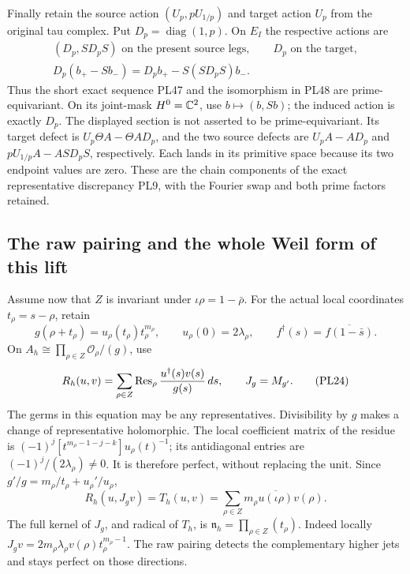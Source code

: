Finally retain the source action
\((U_p,pU_{1/p})\) and target action \(U_p\) from the original
tau complex. Put \(D_p=\operatorname{diag}(1,p)\).
On \(E_I\) the respective actions are
\[
 \begin{gathered}
 (D_p,SD_pS)\text{ on the present source legs},\qquad
 D_p\text{ on the target},\\
 D_p(b_+-Sb_-)=D_pb_+-S(SD_pS)b_-.
 \end{gathered}
 \tag{PL49}
\]
Thus the short exact sequence PL47 and the isomorphism in PL48
are prime-equivariant. On its joint-mask \(H^0=\mathbb C^2\), use
\(b\mapsto(b,Sb)\); the induced action is exactly \(D_p\).
The displayed section is not asserted to be prime-equivariant.
Its target defect is \(U_p\Theta A-\Theta A D_p\), and the two
source defects are \(U_pA-AD_p\) and
\(pU_{1/p}A-ASD_pS\), respectively. Each lands in its primitive
space because its two endpoint values are zero. These are the
chain components of the exact representative discrepancy PL9,
with the Fourier swap and both prime factors retained.

\subsection{The raw pairing and the whole Weil form of this lift}
Assume now that \(Z\) is invariant under
\(\iota\rho=1-\bar\rho\). For the actual local coordinates
\(t_\rho=s-\rho\), retain
\[
 g(\rho+t_\rho)=u_\rho(t_\rho)t_\rho^{m_\rho},
 \qquad u_\rho(0)=2\lambda_\rho,\qquad
 f^\dagger(s)=\overline{f(1-\bar s)}.
 \tag{PL23}
\]
On \(A_h\cong\prod_{\rho\in Z}\mathcal O_\rho/(g)\), use
\[
 R_h(u,v)=\sum_{\rho\in Z}\operatorname{Res}_\rho
       \frac{u^\dagger(s)v(s)}{g(s)}\,ds,\qquad J_g=M_{g'}.
 \tag{PL24}\label{pl:pl:raw}
\]
The germs in this equation may be any representatives.
Divisibility by \(g\) makes a change of representative holomorphic.
The local coefficient matrix of the residue is
\((-1)^j[t^{m_\rho-1-j-k}]u_\rho(t)^{-1}\);
its antidiagonal entries are \((-1)^j/(2\lambda_\rho)\ne0\).
It is therefore perfect, without replacing the unit.
Since \(g'/g=m_\rho/t_\rho+u_\rho'/u_\rho\),
\[
 R_h(u,J_gv)=T_h(u,v)
 =\sum_{\rho\in Z}m_\rho\overline{u(\iota\rho)}v(\rho).
 \tag{PL25}\label{pl:pl:Jacobian}
\]
The full kernel of \(J_g\), and radical of \(T_h\), is
\(\mathfrak n_h=\prod_{\rho\in Z}(t_\rho)\). Indeed locally
\(J_gv=2m_\rho\lambda_\rho v(\rho)t_\rho^{m_\rho-1}\).
The raw pairing detects the complementary higher jets and stays
perfect on those directions.

